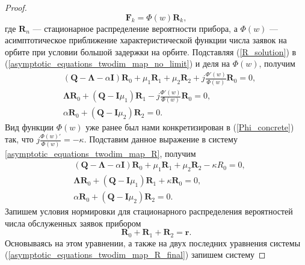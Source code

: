 \begin{proof}
\begin{equation} \label{R_solution}
	\boldsymbol{F}_{k} = \Phi(w)\boldsymbol{R}_{k},
\end{equation}
где $\boldsymbol{R}_{n}$ --- стационарное распределение вероятности прибора, а $\Phi(w)$ --- асимптотическое приближение характеристической функции числа заявок на орбите при условии большой задержки на орбите. Подставляя (\ref{R_solution}) в (\ref{asymptotic_equations_twodim_map_no_limit}) и деля на $\Phi(w)$, получим
\begin{equation}
	\label{asymptotic_equations_twodim_map_R}
	\begin{split}
		&(\boldsymbol{Q}-\boldsymbol{\Lambda}-\alpha\boldsymbol{I})\boldsymbol{R}_{0} + \mu_{1} \boldsymbol{R}_{1}  +  \mu_{2}\boldsymbol{R}_{2} + j
		\frac{\Phi'(w) }{\Phi(w)}\boldsymbol{R}_{0}  = 0,
		\\
		&\boldsymbol{\Lambda} \boldsymbol{R}_{0} +  (\boldsymbol{Q} - \boldsymbol{I}\mu_{1})\boldsymbol{R}_{1} - j\frac{\Phi'(w) }{\Phi(w)}
		\boldsymbol{R}_{0}  = 0,
		\\
		&\alpha \boldsymbol{R}_{0} + (\boldsymbol{Q} - \boldsymbol{I}\mu_{2})\boldsymbol{R}_{2}  = 0.
	\end{split}
\end{equation}
Вид функции $\Phi(w)$ уже ранее был нами конкретизирован в (\ref{Phi_concrete}) так, что $j\frac{\Phi(w)'}{\Phi(w)} = -\kappa$. Подставим данное выражение в систему \ref{asymptotic_equations_twodim_map_R}, получим
\begin{equation}
	\label{asymptotic_equations_twodim_map_R_final}
	\begin{split}
		&(\boldsymbol{Q}-\boldsymbol{\Lambda}-\alpha\boldsymbol{I})\boldsymbol{R}_{0} + \mu_{1} \boldsymbol{R}_{1}  +  \mu_{2}\boldsymbol{R}_{2} -\kappa{R}_{0}  = 0,
		\\
		&\boldsymbol{\Lambda} \boldsymbol{R}_{0} +  (\boldsymbol{Q} - \boldsymbol{I}\mu_{1})\boldsymbol{R}_{1} + \kappa
		\boldsymbol{R}_{0}  = 0,
		\\
		&\alpha \boldsymbol{R}_{0} + (\boldsymbol{Q} - \boldsymbol{I}\mu_{2})\boldsymbol{R}_{2}  = 0.
	\end{split}
\end{equation}
Запишем условия нормировки для стационарного распределения вероятностей числа обслуженных заявок прибором
\begin{equation*}
	\boldsymbol{R}_{0} + \boldsymbol{R}_{1} + \boldsymbol{R}_{2} = \boldsymbol{r}.
\end{equation*}
Основываясь на этом уравнении, а также на двух последних уравнения системы (\ref{asymptotic_equations_twodim_map_R_final}) запишем систему

\end{proof}
